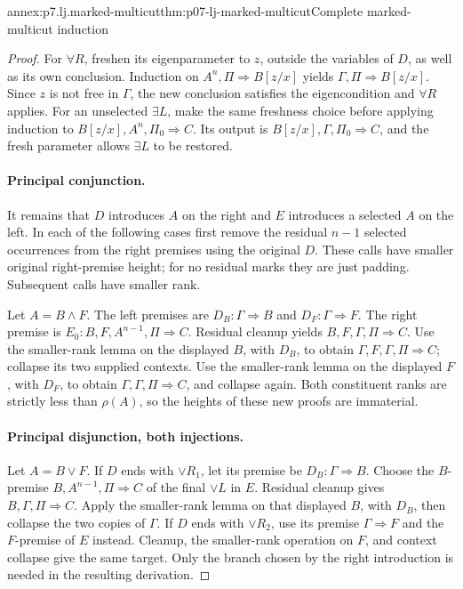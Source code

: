 \begin{annexitem}{annex:p7.lj.marked-multicut}{thm:p07-lj-marked-multicut}{Complete marked-multicut induction}
\begin{proof}
For \(\forall R\), freshen its eigenparameter to \(z\), outside
the variables of \(D\), as well as its own conclusion.  Induction
on \(A^n,\Pi\Rightarrow B[z/x]\) yields
\(\Gamma,\Pi\Rightarrow B[z/x]\).  Since \(z\) is not free
in \(\Gamma\), the new conclusion satisfies the eigencondition and
\(\forall R\) applies.  For an unselected \(\exists L\), make
the same freshness choice before applying induction to
\(B[z/x],A^n,\Pi_0\Rightarrow C\).  Its output is
\(B[z/x],\Gamma,\Pi_0\Rightarrow C\), and the fresh parameter
allows \(\exists L\) to be restored.

\paragraph{Principal conjunction.}
It remains that \(D\) introduces \(A\) on the right and \(E\)
introduces a selected \(A\) on the left.  In each of the following
cases first remove the residual \(n-1\) selected occurrences from
the right premises using the original \(D\).  These calls have
smaller original right-premise height; for no residual marks they are
just padding.  Subsequent calls have smaller rank.

Let \(A=B\land F\).  The left premises are
\(D_B:\Gamma\Rightarrow B\) and
\(D_F:\Gamma\Rightarrow F\).  The right premise is
\(E_0:B,F,A^{n-1},\Pi\Rightarrow C\).  Residual cleanup yields
\(B,F,\Gamma,\Pi\Rightarrow C\).  Use the smaller-rank lemma
on the displayed \(B\), with \(D_B\), to obtain
\(\Gamma,F,\Gamma,\Pi\Rightarrow C\); collapse its two
supplied contexts.  Use the smaller-rank lemma on the displayed \(F\),
with \(D_F\), to obtain \(\Gamma,\Gamma,\Pi\Rightarrow C\),
and collapse again.  Both constituent ranks are strictly less than
\(\rho(A)\), so the heights of these new proofs are immaterial.

\paragraph{Principal disjunction, both injections.}
Let \(A=B\lor F\).  If \(D\) ends with \(\lor R_1\), let
its premise be \(D_B:\Gamma\Rightarrow B\).  Choose the
\(B\)-premise \(B,A^{n-1},\Pi\Rightarrow C\) of the final
\(\lor L\) in \(E\).  Residual cleanup gives
\(B,\Gamma,\Pi\Rightarrow C\).  Apply the smaller-rank lemma
on that displayed \(B\), with \(D_B\), then collapse the two
copies of \(\Gamma\).  If \(D\) ends with \(\lor R_2\), use
its premise \(\Gamma\Rightarrow F\) and the \(F\)-premise
of \(E\) instead.  Cleanup, the smaller-rank operation on \(F\),
and context collapse give the same target.  Only the branch chosen by
the right introduction is needed in the resulting derivation.


\end{proof}
\end{annexitem}
